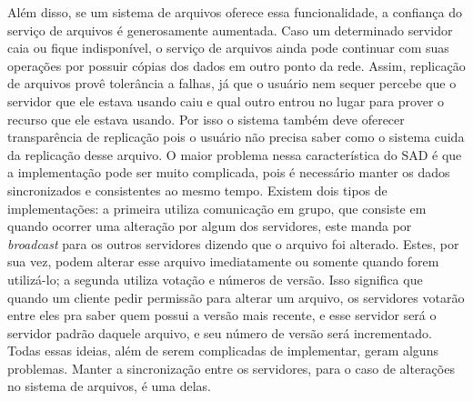 	
	Além disso, se um sistema de arquivos oferece essa funcionalidade, a confiança do serviço de arquivos é generosamente aumentada.
	Caso um determinado servidor caia ou fique indisponível, o serviço de arquivos ainda pode continuar com suas operações por possuir cópias dos dados em outro ponto da rede.
	Assim, replicação de arquivos provê tolerância a falhas, já que o usuário nem sequer percebe que o servidor que ele estava usando caiu e qual outro entrou no lugar para prover o recurso que ele estava usando. Por isso o sistema também deve oferecer transparência de replicação pois o usuário não precisa saber como o sistema cuida da replicação desse arquivo.
	O maior problema nessa característica do SAD é que a implementação pode ser muito complicada, pois é necessário manter os dados sincronizados e consistentes ao mesmo tempo.
	Existem dois tipos de implementações: a primeira utiliza comunicação em grupo, que consiste em quando ocorrer uma alteração por algum dos servidores, este manda por \textit{broadcast} para os outros servidores dizendo que o arquivo foi alterado. Estes, por
	sua vez, podem alterar esse arquivo imediatamente ou somente quando forem utilizá-lo; a segunda utiliza votação e números de versão. Isso significa que quando um cliente pedir permissão para alterar um arquivo, os servidores votarão entre eles pra saber quem possui a versão mais recente, e esse servidor será o servidor padrão daquele arquivo, e seu número de versão será incrementado. Todas essas ideias, além de serem complicadas de implementar, geram alguns problemas. Manter a sincronização entre os servidores, para o caso de alterações no sistema de arquivos, é uma delas.
	
	
